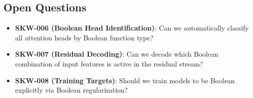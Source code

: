 \subsection{Open Questions}











\begin{itemize}





  \item \textbf{SKW-006 (Boolean Head Identification)}: Can we automatically classify all attention heads by Boolean function type?





  \item \textbf{SKW-007 (Residual Decoding)}: Can we decode which Boolean combination of input features is active in the residual stream?





  \item \textbf{SKW-008 (Training Targets)}: Should we train models to be Boolean explicitly via Boolean regularization?





\end{itemize}




































